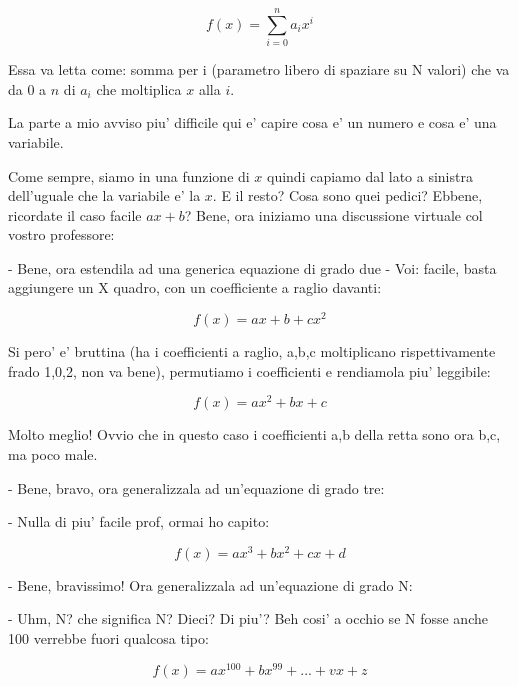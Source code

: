 \begin{equation}
  f(x)= \sum_{i=0}^n a_ix^i 
\end{equation}


Essa va letta come: somma per i (parametro libero di spaziare su N valori) che va da $0$ a $n$ di $a_i$ che moltiplica $x$ alla $i$.

La parte a mio avviso piu' difficile qui e' capire cosa e' un numero e cosa e' una variabile.

Come sempre, siamo in una funzione di $x$ quindi capiamo dal lato a sinistra dell'uguale che la variabile e' la $x$.
E il resto? Cosa sono quei pedici? 
Ebbene, ricordate il caso facile $ a x + b $? Bene, ora iniziamo una discussione virtuale col vostro professore:

- Bene, ora estendila ad una generica equazione di grado due
- Voi: facile, basta aggiungere un X quadro, con un coefficiente a raglio davanti:

\begin{equation}
  f(x)= a x + b + c x^2
\end{equation}

Si pero' e' bruttina (ha i coefficienti a raglio, a,b,c moltiplicano rispettivamente frado 1,0,2, non va bene),
permutiamo i coefficienti e rendiamola piu' leggibile:

\begin{equation}
  f(x)= a x^2 + b x + c
\end{equation}

Molto meglio! Ovvio che in questo caso i coefficienti a,b della retta sono ora b,c, ma poco male.

- Bene, bravo, ora generalizzala ad un'equazione di grado tre:

- Nulla di piu' facile prof, ormai ho capito:

\begin{equation}
  f(x)= a x^3 + b x^2 + cx + d
\end{equation}

- Bene, bravissimo! Ora generalizzala ad un'equazione di grado N:

- Uhm, N? che significa N? Dieci? Di piu'? Beh cosi' a occhio se N fosse anche 100 verrebbe fuori qualcosa tipo:

\begin{equation}
  f(x)= a x^{100} + b x^{99} + ... + v x + z
\end{equation}

